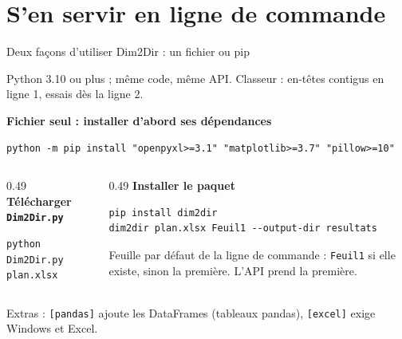 \setcounter{chapCompteur}{3}
\section{S'en servir en ligne de commande}

\begin{frame}[t,fragile]{Deux façons d'utiliser Dim2Dir : un fichier ou pip}
\vfill
{
Python 3.10 ou plus ; même code, même API. Classeur : en-têtes contigus en ligne 1, essais dès la ligne 2.
\par\vspace{0.3em}\noindent\textbf{Fichier seul : installer d'abord ses dépendances}
\begin{lstlisting}[style=py_style1,language={},numbers=none,basicstyle=\ttfamily\footnotesize,xleftmargin=0pt,breakatwhitespace=false,breakindent=0pt,keepspaces=true,breaklines=true]
python -m pip install "openpyxl>=3.1" "matplotlib>=3.7" "pillow>=10"
\end{lstlisting}
\begin{columns}[T,totalwidth=1.05\textwidth]
\begin{column}{0.49\textwidth}
\textbf{Télécharger \texttt{Dim2Dir.py}}
\begin{lstlisting}[style=py_style1,language={},numbers=none,basicstyle=\ttfamily\footnotesize,xleftmargin=0pt,breakatwhitespace=false,breakindent=0pt,keepspaces=true,breaklines=true]
python Dim2Dir.py plan.xlsx
\end{lstlisting}
\end{column}
\begin{column}{0.49\textwidth}
\textbf{Installer le paquet}
\begin{lstlisting}[style=py_style1,language={},numbers=none,basicstyle=\ttfamily\footnotesize,xleftmargin=0pt,breakatwhitespace=false,breakindent=0pt,keepspaces=true,breaklines=true]
pip install dim2dir
dim2dir plan.xlsx Feuil1 --output-dir resultats
\end{lstlisting}
Feuille par défaut de la ligne de commande : \texttt{Feuil1} si elle existe, sinon la première. L'API prend la première.
\end{column}
\end{columns}
Extras : \texttt{[pandas]} ajoute les DataFrames (tableaux pandas), \texttt{[excel]} exige Windows et Excel.}
\vfill
\end{frame}

